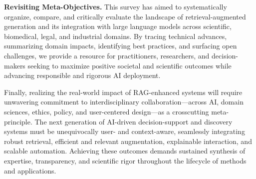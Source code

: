 \documentclass[sigconf]{acmart}
\begin{document}
\vspace{2mm}
\noindent
\textbf{Revisiting Meta-Objectives.}
This survey has aimed to systematically organize, compare, and critically evaluate the landscape of retrieval-augmented generation and its integration with large language models across scientific, biomedical, legal, and industrial domains. By tracing technical advances, summarizing domain impacts, identifying best practices, and surfacing open challenges, we provide a resource for practitioners, researchers, and decision-makers seeking to maximize positive societal and scientific outcomes while advancing responsible and rigorous AI deployment.

Finally, realizing the real-world impact of RAG-enhanced systems will require unwavering commitment to interdisciplinary collaboration—across AI, domain sciences, ethics, policy, and user-centered design—as a crosscutting meta-principle. The next generation of AI-driven decision-support and discovery systems must be unequivocally user- and context-aware, seamlessly integrating robust retrieval, efficient and relevant augmentation, explainable interaction, and scalable automation. Achieving these outcomes demands sustained synthesis of expertise, transparency, and scientific rigor throughout the lifecycle of methods and applications.



\end{document}
